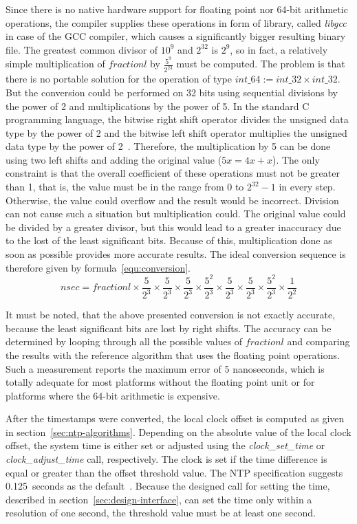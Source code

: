 Since there is no native hardware support for floating point nor 64-bit arithmetic operations,
the compiler supplies these operations in form of library, called {\it{libgcc}} in case of the GCC compiler,
which causes a significantly bigger resulting binary file.
The greatest common divisor of $10^9$ and $2^{32}$ is $2^9$,
so in fact, a relatively simple multiplication of $fractionl$ by $\frac{5^9}{2^{23}}$ must be computed.
The problem is that there is no portable solution for the operation of type $int\_64 := int\_32 \times int\_32$.
But the conversion could be performed on 32 bits using sequential
divisions by the power of 2 and multiplications by the power of 5.
In the standard C programming language, the bitwise right shift operator divides the unsigned data type by the power of 2
and the bitwise left shift operator multiplies the unsigned data type by the power of 2~\cite{c99}.
Therefore, the multiplication by 5 can be done using two left shifts and
adding the original value ($5x = 4x + x$).
The only constraint is that the overall coefficient of these operations must not be greater than 1,
that is, the value must be in the range from $0$ to $2^{32}-1$ in every step.
Otherwise, the value could overflow and the result would be incorrect.
Division can not cause such a situation but multiplication could.
The original value could be divided by a greater divisor,
but this would lead to a greater inaccuracy due to the lost of the least significant bits.
Because of this, multiplication done as soon as possible provides more accurate results.
The ideal conversion sequence is therefore given by formula~\ref{equ:conversion}.
\begin{equation}
\label{equ:conversion}
nsec = fractionl \times \frac{5}{2^3} \times \frac{5}{2^3} \times \frac{5}{2^3} \times \frac{5^2}{2^3} \times \frac{5}{2^3}  \times \frac{5}{2^3} \times \frac{5^2}{2^3} \times \frac{1}{2^2}
\end{equation}

It must be noted, that the above presented conversion is not exactly accurate,
because the least significant bits are lost by right shifts. %
The accuracy can be determined by looping through all the possible values of $fractionl$ %
and comparing the results with the reference algorithm that uses the floating point operations.
Such a measurement reports the maximum error of 5 nanoseconds,
which is totally adequate for most platforms without the floating point unit or
for platforms where the 64-bit arithmetic is expensive.

After the timestamps were converted, the local clock offset is computed
as given in section~\ref{sec:ntp-algorithms}.
Depending on the absolute value of the local clock offset,
the system time is either set or adjusted using the {\it{clock\_set\_time}}
or {\it{clock\_adjust\_time}} call, respectively.
The clock is set if the time difference is equal or greater than
the offset threshold value.
The NTP specification suggests 0.125~seconds as the default~\cite{rfc5905}.
Because the designed call for setting the time, described in section~\ref{sec:design-interface},
can set the time only within a resolution of one second,
the threshold value must be at least one second.
